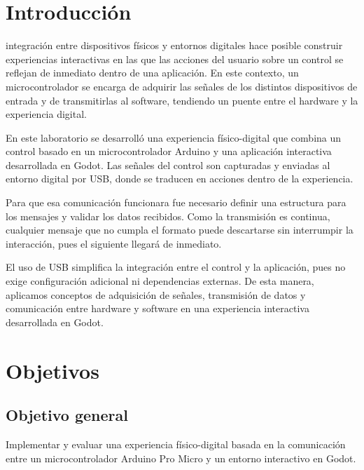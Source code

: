 \documentclass[journal]{IEEEtran}
\begin{document}
\section{Introducción}

 integración entre dispositivos físicos y entornos digitales hace posible construir experiencias interactivas en las que las acciones del usuario sobre un control se reflejan de inmediato dentro de una aplicación. En este contexto, un microcontrolador se encarga de adquirir las señales de los distintos dispositivos de entrada y de transmitirlas al software, tendiendo un puente entre el hardware y la experiencia digital.

En este laboratorio se desarrolló una experiencia físico-digital que combina un control basado en un microcontrolador Arduino y una aplicación interactiva desarrollada en Godot. Las señales del control son capturadas y enviadas al entorno digital por USB, donde se traducen en acciones dentro de la experiencia.

Para que esa comunicación funcionara fue necesario definir una estructura para los mensajes y validar los datos recibidos. Como la transmisión es continua, cualquier mensaje que no cumpla el formato puede descartarse sin interrumpir la interacción, pues el siguiente llegará de inmediato.

El uso de USB simplifica la integración entre el control y la aplicación, pues no exige configuración adicional ni dependencias externas. De esta manera, aplicamos conceptos de adquisición de señales, transmisión de datos y comunicación entre hardware y software en una experiencia interactiva desarrollada en Godot.


\section{Objetivos}

\subsection{Objetivo general}
Implementar y evaluar una experiencia físico-digital basada en la comunicación entre un microcontrolador Arduino Pro Micro y un entorno interactivo en Godot.
\end{document}
